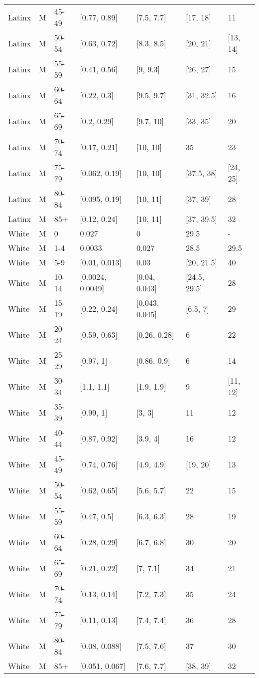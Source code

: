 \begin{table}[ht]
\begin{tabular}{lllllll}
  Latinx & M & 45-49 & [0.77, 0.89] & [7.5, 7.7] & [17, 18] & 11 \\ 
  Latinx & M & 50-54 & [0.63, 0.72] & [8.3, 8.5] & [20, 21] & [13, 14] \\ 
  Latinx & M & 55-59 & [0.41, 0.56] & [9, 9.3] & [26, 27] & 15 \\ 
  Latinx & M & 60-64 & [0.22, 0.3] & [9.5, 9.7] & [31, 32.5] & 16 \\ 
  Latinx & M & 65-69 & [0.2, 0.29] & [9.7, 10] & [33, 35] & 20 \\ 
  Latinx & M & 70-74 & [0.17, 0.21] & [10, 10] & 35 & 23 \\ 
  Latinx & M & 75-79 & [0.062, 0.19] & [10, 10] & [37.5, 38] & [24, 25] \\ 
  Latinx & M & 80-84 & [0.095, 0.19] & [10, 11] & [37, 39] & 28 \\ 
  Latinx & M & 85+ & [0.12, 0.24] & [10, 11] & [37, 39.5] & 32 \\ 
  White & M & 0 & 0.027 & 0 & 29.5 & - \\ 
  White & M & 1-4 & 0.0033 & 0.027 & 28.5 & 29.5 \\ 
  White & M & 5-9 & [0.01, 0.013] & 0.03 & [20, 21.5] & 40 \\ 
  White & M & 10-14 & [0.0024, 0.0049] & [0.04, 0.043] & [24.5, 29.5] & 28 \\ 
  White & M & 15-19 & [0.22, 0.24] & [0.043, 0.045] & [6.5, 7] & 29 \\ 
  White & M & 20-24 & [0.59, 0.63] & [0.26, 0.28] & 6 & 22 \\ 
  White & M & 25-29 & [0.97, 1] & [0.86, 0.9] & 6 & 14 \\ 
  White & M & 30-34 & [1.1, 1.1] & [1.9, 1.9] & 9 & [11, 12] \\ 
  White & M & 35-39 & [0.99, 1] & [3, 3] & 11 & 12 \\ 
  White & M & 40-44 & [0.87, 0.92] & [3.9, 4] & 16 & 12 \\ 
  White & M & 45-49 & [0.74, 0.76] & [4.9, 4.9] & [19, 20] & 13 \\ 
  White & M & 50-54 & [0.62, 0.65] & [5.6, 5.7] & 22 & 15 \\ 
  White & M & 55-59 & [0.47, 0.5] & [6.3, 6.3] & 28 & 19 \\ 
  White & M & 60-64 & [0.28, 0.29] & [6.7, 6.8] & 30 & 20 \\ 
  White & M & 65-69 & [0.21, 0.22] & [7, 7.1] & 34 & 21 \\ 
  White & M & 70-74 & [0.13, 0.14] & [7.2, 7.3] & 35 & 24 \\ 
  White & M & 75-79 & [0.11, 0.13] & [7.4, 7.4] & 36 & 28 \\ 
  White & M & 80-84 & [0.08, 0.088] & [7.5, 7.6] & 37 & 30 \\ 
  White & M & 85+ & [0.051, 0.067] & [7.6, 7.7] & [38, 39] & 32 \\ 
   \hline
\end{tabular}
\end{table}
